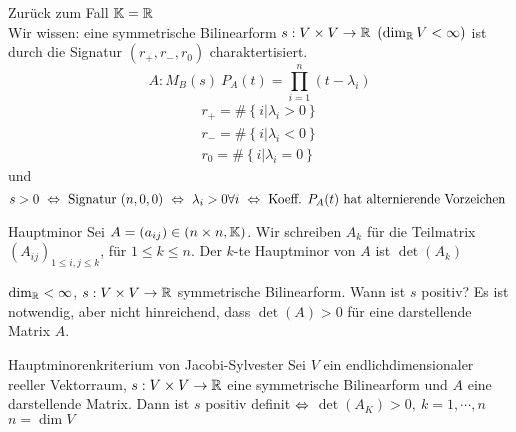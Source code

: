 \begin{Faz}
  Zurück zum Fall $\mathbb{K}=\mathbb{R}$\\
  Wir wissen: eine symmetrische Bilinearform $s:V\times V\to\mathbb{R}$ $(\dim_{\mathbb{R}}V<\infty)$ ist durch die Signatur $(r_+,r_-,r_0)$ charaktertisiert.
  \[A:M_B(s)\ P_A(t)=\prod^n_{i=1}(t-\lambda_i)\]
  \begin{gather*}
    r_+=\#\left\{ i|\lambda_i>0 \right\}\\
    r_-=\#\left\{ i|\lambda_i<0 \right\}\\ 
    r_0=\#\left\{ i|\lambda_i=0 \right\}
  \end{gather*}
  und
  \[s>0\ \Lra\ \text{Signatur } (n,0,0)\ \Lra\ \lambda_i>0\forall i\ \Lra\ \text{Koeff. }P_A(t)\ \text{hat alternierende Vorzeichen }\]
\end{Faz}
\begin{Def}{Hauptminor}
  Sei $A=(a_{ij})\in(n\times n, \mathbb{K})$. Wir schreiben $A_k$ für die Teilmatrix $(A_{ij})_{1\leq i,j\leq k}$, für $1\leq k\leq n$. Der $k$-te Hauptminor von $A$ ist $\det (A_k)$
\end{Def}
\begin{Bem}
  $\dim_{\mathbb{R}}<\infty$, $s:V\times V\to\mathbb{R}$ symmetrische Bilinearform. Wann ist $s$ positiv? Es ist notwendig, aber nicht hinreichend, dass $\det(A)>0$ für eine darstellende Matrix $A$.
\end{Bem}
\begin{Prop}{Hauptminorenkriterium von Jacobi-Sylvester}
  Sei $V$ ein endlichdimensionaler reeller Vektorraum, $s:V\times V\to\mathbb{R}$ eine symmetrische Bilinearform und $A$ eine darstellende Matrix. Dann ist $s$ positiv definit $\Leftrightarrow$ $\det(A_K)>0,\ k=1,\cdots,n$ $n=\dim V$
\end{Prop}
